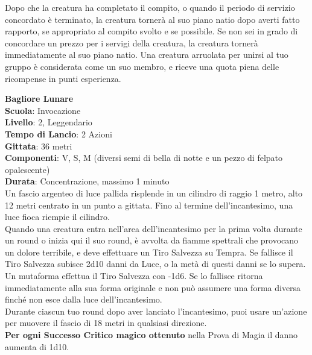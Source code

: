 \begin{multicols}{2}
Dopo che la creatura ha completato il compito, o quando il periodo di servizio concordato è terminato, la creatura tornerà al suo piano natio dopo averti fatto rapporto, se appropriato al compito svolto e se possibile. Se non sei in grado di concordare un prezzo per i servigi della creatura, la creatura tornerà immediatamente al suo piano natio. Una creatura arruolata per unirsi al tuo gruppo è considerata come un suo membro, e riceve una quota piena delle ricompense in punti esperienza.

\medskip\textbf{Bagliore Lunare}\\
\textbf{Scuola}: Invocazione\\
\textbf{Livello}: 2, Leggendario\\
\textbf{Tempo di Lancio}: 2 Azioni\\
\textbf{Gittata}: 36 metri\\
\textbf{Componenti}: V, S, M (diversi semi di bella di notte e un pezzo di felpato opalescente)\\
\textbf{Durata}: Concentrazione, massimo 1 minuto\\
Un fascio argenteo di luce pallida risplende in un cilindro di raggio 1 metro, alto 12 metri centrato in un punto a gittata. Fino al termine dell'incantesimo, una luce fioca riempie il cilindro. \\
Quando una creatura entra nell'area dell'incantesimo per la prima volta durante un round o inizia qui il suo round, è avvolta da fiamme spettrali che provocano un dolore terribile, e deve effettuare un Tiro Salvezza su Tempra. Se fallisce il Tiro Salvezza subisce 2d10 danni da Luce, o la metà di questi danni se lo supera. Un mutaforma effettua il Tiro Salvezza con -1d6. Se lo fallisce ritorna immediatamente alla sua forma originale e non può assumere una forma diversa finché non esce dalla luce dell'incantesimo.\\
Durante ciascun tuo round dopo aver lanciato l'incantesimo, puoi usare un'azione per muovere il
fascio di 18 metri in qualsiasi direzione. \\
\textbf{Per ogni Successo Critico magico ottenuto} nella Prova di Magia il danno aumenta di 1d10.


\end{multicols}
